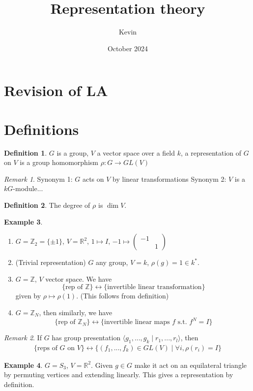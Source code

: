 \documentclass{article}
\title{Representation theory}
\author{Kevin}
\date{October 2024}
\theoremstyle{definition}
\newtheorem{defn}{Definition}[section]
\newtheorem{example}[defn]{Example}
\theoremstyle{remark}
\newtheorem{rem}{Remark}
\theoremstyle{plain}
\newcommand{\ZZ}{\mathbb{Z}}
\newcommand{\RR}{\mathbb{R}}
\begin{document}
\maketitle
\section{Revision of LA}
\section{Definitions}
\begin{defn}
    $G$ is a group, $V$ a vector space over a field $k$, a representation of $G$ on $V$ is a group homomorphism $\rho:G\to GL(V)$
\end{defn}
\begin{rem}
    Synonym 1: $G$ acts on $V$ by linear transformations
    Synonym 2: $V$ is a $kG$-module...
\end{rem}
\begin{defn}
    The degree of $\rho$ is $\dim V$.
\end{defn}
\begin{example}
\begin{enumerate}
    \item $G=\ZZ_2=\{\pm 1\}$, $V=\RR^2$, $1\mapsto I$, $-1\mapsto \begin{pmatrix}
        -1&\\
        &1
    \end{pmatrix}$
    \item (Trivial representation) $G$ any group, $V=k$, $\rho(g)=1\in k^\ast$.
    \item $G=\ZZ$, $V$ vector space. We have 
    \[\{\text{rep of }\ZZ\}\leftrightarrow\{\text{invertible linear transformation}\}\]
    given by $\rho\mapsto \rho(1)$. (This follows from definition)
    \item $G=\ZZ_N$, then similarly, we have
    \[\{\text{rep of }\ZZ_N\}\leftrightarrow\{\text{invertible linear maps }f\text{ s.t. }f^N=I\}\]
\end{enumerate}
\end{example}
\begin{rem}
    If $G$ has group presentation $\langle g_1,...,g_k\mid r_1,...,r_l\rangle$, then
    \begin{align*}
        \{\text{reps of }G\text{ on }V\}\leftrightarrow\{(f_1,...,f_k)\in GL(V)\mid \forall i,\rho(r_i)=I\}
    \end{align*}
\end{rem}
\begin{example}
    $G=S_3$, $V=\RR^2$. Given $g\in G$ make it act on an equilateral triangle by permuting vertices and extending linearly. This gives a representation by definition.
\end{example}
\end{document}
